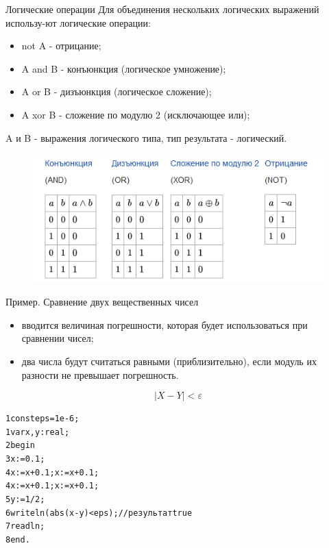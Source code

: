 \documentclass{beamer}
\begin{document}
\begin{frame}[fragile]{Логические операции}
Для объединения нескольких логических выражений использу-ют логические операции: 
\begin{itemize}
\item not A - отрицание;
\item A and B - конъюнкция (логическое умножение); 
\item A or B - дизъюнкция (логическое сложение);
\item A xor B - сложение по модулю 2 (исключающее или);
\end{itemize}
A и B - выражения логического типа, тип результата - логический.
\begin{figure}[h]
\centering
\includegraphics[scale=0.5]{images/lec03-pic02.png}
\end{figure}
\end{frame}

\begin{frame}[fragile]{Пример. Сравнение двух вещественных чисел}
\begin{itemize}
\item вводится величиная погрешности, которая будет использоваться при сравнении чисел;
\item два числа будут считаться равными (приблизительно), если модуль их разности не превышает погрешность.
\end{itemize}
\[|X - Y| < \varepsilon\]
\begin{alltt}
1 const eps = 1e-6;
1 var x, y: real;
2 begin
3   x := 0.1;
4   x := x + 0.1; x := x + 0.1;
4   x := x + 0.1; x := x + 0.1;
5   y := 1/2;
6   writeln(abs(x-y)<eps); //результат true
7   readln;
8 end.
\end{alltt}
\end{frame}
\end{document}
